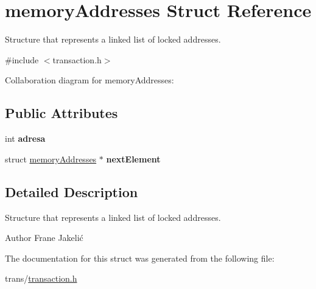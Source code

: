 \hypertarget{structmemoryAddresses}{}\section{memory\+Addresses Struct Reference}
\label{structmemoryAddresses}


Structure that represents a linked list of locked addresses.  




{\ttfamily \#include $<$transaction.\+h$>$}



Collaboration diagram for memory\+Addresses\+:
\subsection*{Public Attributes}
\begin{DoxyCompactItemize}
\item 
int {\bfseries adresa}\hypertarget{structmemoryAddresses_aec25a7082201140bdc5e4047d2280f5a}{}\label{structmemoryAddresses_aec25a7082201140bdc5e4047d2280f5a}

\item 
struct \hyperlink{structmemoryAddresses}{memory\+Addresses} $\ast$ {\bfseries next\+Element}\hypertarget{structmemoryAddresses_a3500fd65745a7c7df644c3ac4efcff6c}{}\label{structmemoryAddresses_a3500fd65745a7c7df644c3ac4efcff6c}

\end{DoxyCompactItemize}


\subsection{Detailed Description}
Structure that represents a linked list of locked addresses. 

\begin{DoxyAuthor}{Author}
Frane Jakelić 
\end{DoxyAuthor}


The documentation for this struct was generated from the following file\+:\begin{DoxyCompactItemize}
\item 
trans/\hyperlink{transaction_8h}{transaction.\+h}\end{DoxyCompactItemize}
